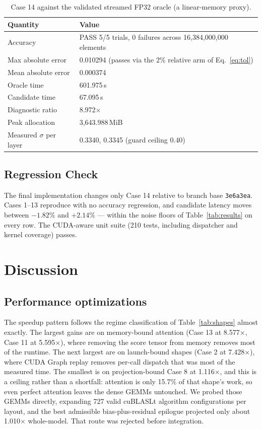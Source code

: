 \documentclass[10pt,conference,compsoc]{IEEEtran}
\begin{document}
\begin{table}[H]
\centering
\footnotesize
\begin{tabular}{p{2.6cm} p{4.9cm}}
\hline
\textbf{Quantity} & \textbf{Value} \\
\hline
Accuracy & PASS 5/5 trials, 0 failures across 16{,}384{,}000{,}000 elements \\
Max absolute error & 0.010294 (passes via the 2\% relative arm of Eq.~\ref{eq:tol}) \\
Mean absolute error & 0.000374 \\
Oracle time & 601.975\,s \\
Candidate time & 67.095\,s \\
Diagnostic ratio & 8.972$\times$ \\
Peak allocation & 3{,}643.988\,MiB \\
Measured $\sigma$ per layer & 0.3340, 0.3345 (guard ceiling 0.40) \\
\hline
\end{tabular}
\vspace{6pt}
\caption{Case 14 against the validated streamed FP32 oracle (a linear-memory proxy).}
\label{tab:case14}
\end{table}

\subsection{Regression Check}
The final implementation changes only Case 14 relative to branch base \texttt{3e6a3ea}. Cases 1--13 reproduce with no accuracy regression, and candidate latency moves between $-1.82\%$ and $+2.14\%$ --- within the noise floors of Table~\ref{tab:results} on every row. The CUDA-aware unit suite (210 tests, including dispatcher and kernel coverage) passes.

\section{Discussion}

\subsection{Performance optimizations}
The speedup pattern follows the regime classification of Table~\ref{tab:shapes} almost exactly. The largest gains are on memory-bound attention (Case 13 at 8.577$\times$, Case 11 at 5.595$\times$), where removing the score tensor from memory removes most of the runtime. The next largest are on launch-bound shapes (Case 2 at 7.428$\times$), where CUDA Graph replay removes per-call dispatch that was most of the measured time. The smallest is on projection-bound Case 8 at 1.116$\times$, and this is a ceiling rather than a shortfall: attention is only 15.7\% of that shape's work, so even perfect attention leaves the dense GEMMs untouched. We probed those GEMMs directly, expanding 727 valid cuBLASLt algorithm configurations per layout, and the best admissible bias-plus-residual epilogue projected only about 1.010$\times$ whole-model. That route was rejected before integration.
\end{document}
